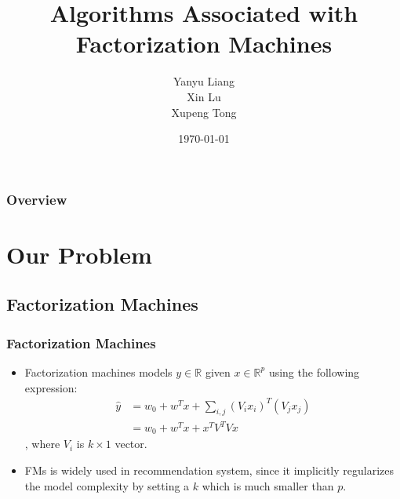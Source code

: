 \documentclass{beamer}
\title[Algos for FMs]{Algorithms Associated with Factorization Machines} %
\author{Yanyu Liang \\
Xin Lu \\
Xupeng Tong} %
\institute[CMU] %
{
Carnegie Mellon University \\ %
\medskip
\textit{\{yanyul,xlu2,xtong\}@andrew.cmu.edu} %
}
\date{\today} %
\begin{document}
\begin{frame}
\titlepage %
\end{frame}

\begin{frame}
\begin{multicols}{2}
\frametitle{Overview} %
\tableofcontents %
\end{multicols}
\end{frame}


\section{Our Problem} %
  \subsection{Factorization Machines}
  \begin{frame}
  \frametitle{Factorization Machines}
    \begin{itemize}
      \item Factorization machines \cite{rendle2010factorization} models $y \in \mathbb{R}$ given $x \in \mathbb{R}^p$ using the following expression:
      \begin{align*}
        \hat{y} &= w_0 + w^T x + \sum_{i, j} (V_ix_i)^T(V_jx_j) \\
        &= w_0 + w^T x + x^T V^T V x
      \end{align*}
      , where $V_i$ is $k \times 1$ vector. 
      \item FMs is widely used in recommendation system, since it implicitly regularizes the model complexity by setting a $k$ which is much smaller than $p$.
    \end{itemize}
  \end{frame}
\end{document}
